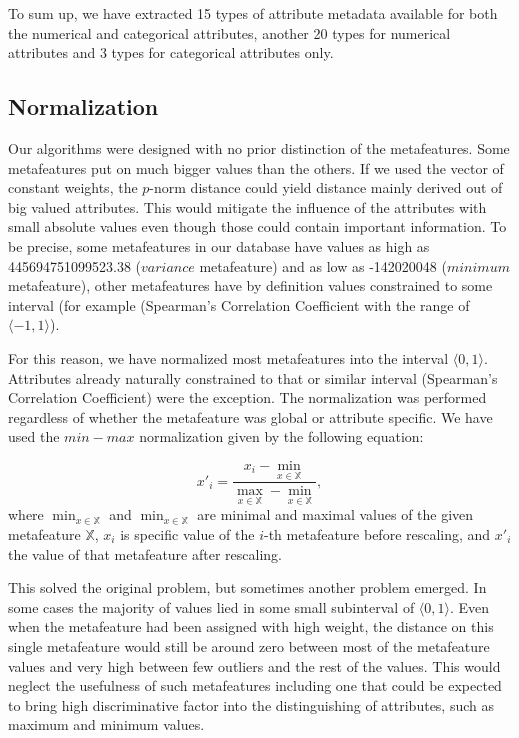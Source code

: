 To sum up, we have extracted 15 types of attribute metadata available for both the numerical and categorical attributes, another 20 types for numerical attributes and 3 types for categorical attributes only.

\subsection{Normalization}
Our algorithms were designed with no prior distinction of the metafeatures.
Some metafeatures put on much bigger values than the others. If we used the vector of constant weights, the $p$-norm distance could yield distance mainly derived out of big valued attributes. This would mitigate the influence of the attributes with small absolute values even though those could contain important information. To be precise, some metafeatures in our database have values as high as 445694751099523.38 ($variance$ metafeature) and as low as -142020048 ($minimum$ metafeature), other metafeatures have by definition values constrained to some interval (for example (Spearman's Correlation Coefficient with the range of $\langle -1,1 \rangle$).

For this reason, we have normalized most metafeatures into the interval $\langle 0,1 \rangle$. Attributes already naturally constrained to that or similar interval (Spearman's Correlation Coefficient) were the exception. The normalization was performed regardless of whether the metafeature was global or attribute specific. We have used the $min-max$ normalization given by the following equation:

\begin{equation*}
x'_i=\frac{x_i - \min_{x \in \mathbb{X}}}{\max_{x \in \mathbb{X}}-\min_{x \in \mathbb{X}}},
\end{equation*}
where $\min_{x \in \mathbb{X}}$ and $\min_{x \in \mathbb{X}}$ are minimal and maximal values of the given metafeature $\mathbb{X}$, $x_i$ is specific value of the $i$-th metafeature before rescaling, and $x'_i$ the value of that metafeature after rescaling.

This solved the original problem, but sometimes another problem emerged. In some cases the majority of values lied in some small subinterval of $\langle 0,1 \rangle$. Even when the metafeature had been assigned with high weight, the distance on this single metafeature would still be around zero between most of the metafeature values and very high between few outliers and the rest of the values. This would neglect the usefulness of such metafeatures including one that could be expected to bring high discriminative factor into the distinguishing of attributes, such as maximum and minimum values.


